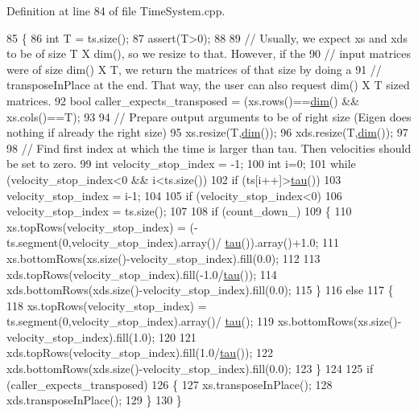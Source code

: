 Definition at line 84 of file Time\+System.\+cpp.


\begin{DoxyCode}
85 \{
86   \textcolor{keywordtype}{int} T = ts.size();
87   assert(T>0);
88 
89   \textcolor{comment}{// Usually, we expect xs and xds to be of size T X dim(), so we resize to that. However, if the}
90   \textcolor{comment}{// input matrices were of size dim() X T, we return the matrices of that size by doing a }
91   \textcolor{comment}{// transposeInPlace at the end. That way, the user can also request dim() X T sized matrices.}
92   \textcolor{keywordtype}{bool} caller\_expects\_transposed = (xs.rows()==\hyperlink{group__DynamicalSystems_ga6f628f7f4ed9d77bf69f5b8560b98f18}{dim}() && xs.cols()==T);
93 
94   \textcolor{comment}{// Prepare output arguments to be of right size (Eigen does nothing if already the right size)}
95   xs.resize(T,\hyperlink{group__DynamicalSystems_ga6f628f7f4ed9d77bf69f5b8560b98f18}{dim}());
96   xds.resize(T,\hyperlink{group__DynamicalSystems_ga6f628f7f4ed9d77bf69f5b8560b98f18}{dim}());
97   
98   \textcolor{comment}{// Find first index at which the time is larger than tau. Then velocities should be set to zero.}
99   \textcolor{keywordtype}{int} velocity\_stop\_index = -1;
100   \textcolor{keywordtype}{int} i=0;
101   \textcolor{keywordflow}{while} (velocity\_stop\_index<0 && i<ts.size())
102     \textcolor{keywordflow}{if} (ts[i++]>\hyperlink{group__DynamicalSystems_ga50eec7ad4c9664b5809ace45b22200d5}{tau}())
103       velocity\_stop\_index = i-1;
104     
105   \textcolor{keywordflow}{if} (velocity\_stop\_index<0)
106     velocity\_stop\_index = ts.size();
107 
108   \textcolor{keywordflow}{if} (count\_down\_)
109   \{
110     xs.topRows(velocity\_stop\_index) = (-ts.segment(0,velocity\_stop\_index).array()/
      \hyperlink{group__DynamicalSystems_ga50eec7ad4c9664b5809ace45b22200d5}{tau}()).array()+1.0;
111     xs.bottomRows(xs.size()-velocity\_stop\_index).fill(0.0);
112   
113     xds.topRows(velocity\_stop\_index).fill(-1.0/\hyperlink{group__DynamicalSystems_ga50eec7ad4c9664b5809ace45b22200d5}{tau}());
114     xds.bottomRows(xds.size()-velocity\_stop\_index).fill(0.0);
115   \}
116   \textcolor{keywordflow}{else}
117   \{
118     xs.topRows(velocity\_stop\_index) = ts.segment(0,velocity\_stop\_index).array()/
      \hyperlink{group__DynamicalSystems_ga50eec7ad4c9664b5809ace45b22200d5}{tau}();
119     xs.bottomRows(xs.size()-velocity\_stop\_index).fill(1.0);
120   
121     xds.topRows(velocity\_stop\_index).fill(1.0/\hyperlink{group__DynamicalSystems_ga50eec7ad4c9664b5809ace45b22200d5}{tau}());
122     xds.bottomRows(xds.size()-velocity\_stop\_index).fill(0.0);
123   \}
124   
125   \textcolor{keywordflow}{if} (caller\_expects\_transposed)
126   \{
127     xs.transposeInPlace();
128     xds.transposeInPlace();
129   \}
130 \}
\end{DoxyCode}


